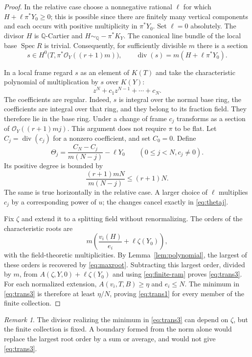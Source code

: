 \documentclass[11pt,reqno]{amsart}
\numberwithin{equation}{section}
\theoremstyle{definition}
\theoremstyle{remark}
\newtheorem{remark}[theorem]{Remark}
\newcommand{\Q}{\mathbb Q}
\newcommand{\OO}{\mathcal O}
\newcommand{\simq}{\sim_{\Q}}
\newcommand{\Spec}{\operatorname{Spec}}
\newcommand{\Div}{\operatorname{div}}
\begin{document}
\begin{proof}
In the relative case choose a nonnegative rational $\ell$ for which $H+\ell\pi^*Y_0\ge0$; this is possible since there are finitely many vertical components and each occurs with positive multiplicity in $\pi^*Y_0$. Set $\ell=0$ absolutely. The divisor $H$ is $\Q$-Cartier and $H\simq-\pi^*K_Y$. The canonical line bundle of the local base $\Spec R$ is trivial. Consequently, for sufficiently divisible $m$ there is a section
\[
 s\in H^0\bigl(T,\pi^*\OO_Y((r+1)m)\bigr),\qquad
 \Div(s)=m(H+\ell\pi^*Y_0).
\]

In a local frame regard $s$ as an element of $K(T)$ and take the characteristic polynomial of multiplication by $s$ over $K(Y)$:
\[
 z^N+c_1z^{N-1}+\cdots+c_N.
\]
The coefficients are regular. Indeed, $s$ is integral over the normal base ring, the coefficients are integral over that ring, and they belong to its fraction field. They therefore lie in the base ring. Under a change of frame $c_j$ transforms as a section of $\OO_Y((r+1)mj)$. This argument does not require $\pi$ to be flat. Let $C_j=\Div(c_j)$ for a nonzero coefficient, and set $C_0=0$. Define
\begin{equation}\label{eq:thetaj}
 \Theta_j=\frac{C_N-C_j}{m(N-j)}-\ell Y_0
 \qquad(0\le j<N, c_j\ne0).
\end{equation}
Its positive degree is bounded by
\[
 \frac{(r+1)mN}{m(N-j)}\le(r+1)N.
\]
The same is true horizontally in the relative case. A larger choice of $\ell$ multiplies $c_j$ by a corresponding power of $u$; the changes cancel exactly in \eqref{eq:thetaj}.

Fix $\zeta$ and extend it to a splitting field without renormalizing. The orders of the characteristic roots are
\[
 m\left(\frac{v_i(H)}{e_i}+\ell\zeta(Y_0)\right),
\]
with the field-theoretic multiplicities. By Lemma~\ref{lem:polynomial}, the largest of these orders is recovered by \eqref{eq:maxroot}. Subtracting this largest order, divided by $m$, from $A(\zeta,Y,0)+\ell\zeta(Y_0)$ and using \eqref{eq:finite-ram} proves \eqref{eq:trans3}. For each normalized extension, $A(v_i,T,B)\ge\eta$ and $e_i\le N$. The minimum in \eqref{eq:trans3} is therefore at least $\eta/N$, proving \eqref{eq:trans1} for every member of the finite collection.
\end{proof}

\begin{remark}
The divisor realizing the minimum in \eqref{eq:trans3} can depend on $\zeta$, but the finite collection is fixed. A boundary formed from the norm alone would replace the largest root order by a sum or average, and would not give \eqref{eq:trans3}.
\end{remark}
\end{document}

